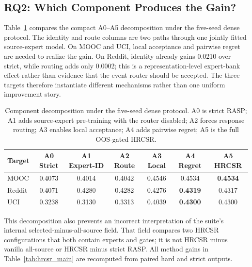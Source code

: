 \documentclass[journal]{IEEEtran}
\begin{document}
\subsection{RQ2: Which Component Produces the Gain?}
Table~\ref{tab:hrcsr_components} compares the compact A0--A5 decomposition under the five-seed dense protocol. The identity and route columns are two paths through one jointly fitted source-expert model. On MOOC and UCI, local acceptance and pairwise regret are needed to realize the gain. On Reddit, identity already gains 0.0210 over strict, while routing adds only 0.0002; this is a representation-level expert-bank effect rather than evidence that the event router should be accepted. The three targets therefore instantiate different mechanisms rather than one uniform improvement story.

\begin{table}[t]
\centering
\caption{Component decomposition under the five-seed dense protocol. A0 is strict RASP; A1 adds source-expert pre-training with the router disabled; A2 forces response routing; A3 enables local acceptance; A4 adds pairwise regret; A5 is the full OOS-gated HRCSR.}
\label{tab:hrcsr_components}
\small
\begin{tabular}{lcccccc}
\toprule
\textbf{Target} & \textbf{A0 Strict} & \textbf{A1 Expert-ID} & \textbf{A2 Route} & \textbf{A3 Local} & \textbf{A4 Regret} & \textbf{A5 HRCSR} \\
\midrule
MOOC      & 0.4073 & 0.4014 & 0.4042 & 0.4546 & 0.4534 & \textbf{0.4534} \\
Reddit    & 0.4071 & 0.4280 & 0.4282 & 0.4276 & \textbf{0.4319} & 0.4317 \\
UCI       & 0.3238 & 0.3130 & 0.3313 & 0.4039 & \textbf{0.4300} & 0.4300 \\
\bottomrule
\end{tabular}
\end{table}
This decomposition also prevents an incorrect interpretation of the suite's internal selected-minus-all-source field. That field compares two HRCSR configurations that both contain experts and gates; it is not HRCSR minus vanilla all-source or HRCSR minus strict RASP. All method gains in Table~\ref{tab:hrcsr_main} are recomputed from paired hard and strict outputs.
\end{document}
